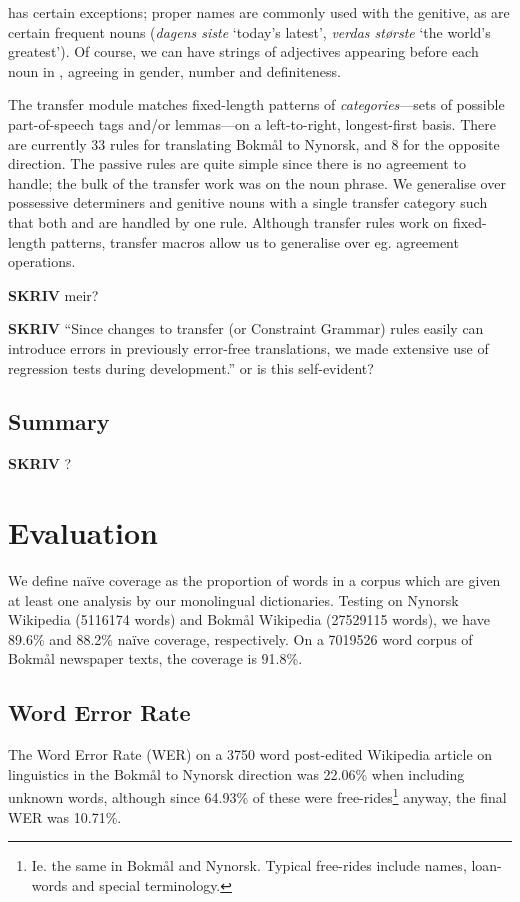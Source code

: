 \documentclass[11pt]{article}
\begin{document}
\Last has certain exceptions; proper names are commonly used with the
genitive, as are certain frequent nouns (\emph{dagens siste} `today's
latest', \emph{verdas største} `the world's greatest'). Of course, we
can have strings of adjectives appearing before each noun in
\Last[a-d], agreeing in gender, number and definiteness.

The transfer module matches fixed-length patterns of
\emph{categories}—sets of possible part-of-speech tags and/or
lemmas—on a left-to-right, longest-first basis. There are currently 33
rules for translating Bokmål to Nynorsk, and 8 for the opposite
direction. The passive rules are quite simple since there is no
agreement to handle; the bulk of the transfer work was on the noun
phrase. We generalise over possessive determiners and genitive nouns
with a single transfer category such that both \Last[a-b] and
\Last[c-d] are handled by one rule. Although transfer rules work on
fixed-length patterns, transfer macros allow us to generalise over eg.
agreement operations.

\textbf{SKRIV} meir?

\textbf{SKRIV} ``Since changes to transfer (or Constraint
  Grammar) rules easily can introduce errors in previously error-free
  translations, we made extensive use of regression tests during
  development.'' or is this self-evident?

\subsection{Summary}
\textbf{SKRIV} ?


\section{Evaluation}
\label{SEC:eval}

We define naïve coverage as the proportion of words in a corpus which
are given at least one analysis by our monolingual dictionaries.
Testing on Nynorsk Wikipedia (5116174 words) and Bokmål Wikipedia
(27529115 words), we have 89.6\% and 88.2\% naïve coverage,
respectively. On a 7019526 word corpus of Bokmål newspaper texts, the
coverage is 91.8\%.

\subsection{Word Error Rate}
\label{WER}
The Word Error Rate (WER) on a 3750 word post-edited Wikipedia article
on linguistics in the Bokmål to Nynorsk direction was 22.06\% when
including unknown words, although since 64.93\% of these were
free-rides\footnote{Ie. the same in Bokmål and Nynorsk. Typical
  free-rides include names, loan-words and special terminology.}
anyway, the final WER was 10.71\%. 
\end{document}
